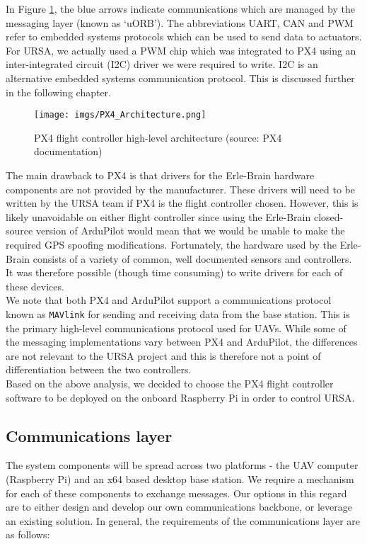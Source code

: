 \documentclass[capstone_report.tex]{subfiles}
\begin{document}
In Figure \ref{fig:PX4Arch}, the blue arrows indicate communications which are managed by the messaging layer (known as `uORB'). The abbreviations UART, CAN and PWM refer to embedded systems protocols which can be used to send data to actuators. For URSA, we actually used a PWM chip which was integrated to PX4 using an inter-integrated circuit (I2C) driver we were required to write. I2C is an alternative embedded systems communication protocol. This is discussed further in the following chapter.\\

\begin{figure}[H]
    \centering
    \texttt{[image: imgs/PX4\_Architecture.png]}
    \caption{PX4 flight controller high-level architecture (source: PX4 documentation)\label{fig:PX4Arch}}
\end{figure}

The main drawback to PX4 is that drivers for the Erle-Brain hardware components are not provided by the manufacturer. These drivers will need to be written by the URSA team if PX4 is the flight controller chosen. However, this is likely unavoidable on either flight controller since using the Erle-Brain closed-source version of ArduPilot would mean that we would be unable to make the required GPS spoofing modifications. Fortunately, the hardware used by the Erle-Brain consists of a variety of common, well documented sensors and controllers. It was therefore possible (though time consuming) to write drivers for each of these devices.\\

We note that both PX4 and ArduPilot support a communications protocol known as \texttt{MAVlink} for sending and receiving data from the base station. This is the primary high-level communications protocol used for UAVs. While some of the messaging implementations vary between PX4 and ArduPilot, the differences are not relevant to the URSA project and this is therefore not a point of differentiation between the two controllers. \\

Based on the above analysis, we decided to choose the PX4 flight controller software to be deployed on the onboard Raspberry Pi in order to control URSA.

\subsection{Communications layer}\label{subsec:comm_layer}
The system components will be spread across two platforms - the UAV computer (Raspberry Pi) and an x64 based desktop base station. We require a mechanism for each of these components to exchange messages. Our options in this regard are to either design and develop our own communications backbone, or leverage an existing solution. In general, the requirements of the communications layer are as follows:
\end{document}
